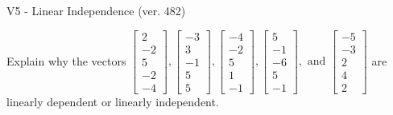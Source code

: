 \begin{exercise}
  \begin{exerciseTitle}V5 - Linear Independence (ver. 482)\end{exerciseTitle}
  \begin{exerciseStatement}
    Explain why the vectors \(\left[\begin{array}{r}
2 \\
-2 \\
5 \\
-2 \\
-4
\end{array}\right] , \left[\begin{array}{r}
-3 \\
3 \\
-1 \\
5 \\
5
\end{array}\right] , \left[\begin{array}{r}
-4 \\
-2 \\
5 \\
1 \\
-1
\end{array}\right] , \left[\begin{array}{r}
5 \\
-1 \\
-6 \\
5 \\
-1
\end{array}\right] , \text{ and } \left[\begin{array}{r}
-5 \\
-3 \\
2 \\
4 \\
2
\end{array}\right]\) are linearly dependent or linearly independent.	



\end{exerciseStatement}
\end{exercise}
